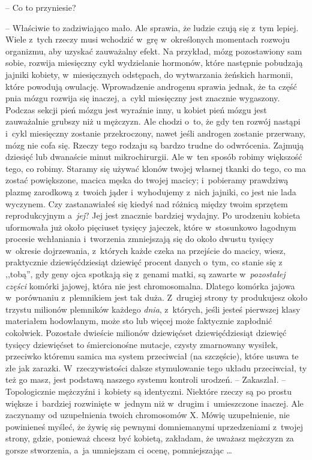 \documentclass[oneside,polish,11pt,rmheadings]{mwbk}
\begin{document}
-- Co to przyniesie?  

-- Właściwie to zadziwiająco mało. Ale sprawia, że ludzie czują się z~tym lepiej. Wiele z~tych rzeczy musi wchodzić w~grę w~określonych momentach rozwoju organizmu, aby uzyskać zauważalny efekt. Na przykład, mózg pozostawiony sam sobie, rozwija miesięczny cykl wydzielanie hormonów, które następnie pobudzają jajniki kobiety, w~miesięcznych odstępach, do wytwarzania żeńskich harmonii, które powodują owulację. Wprowadzenie androgenu sprawia jednak, że ta część pnia mózgu rozwija się inaczej, a~cykl miesięczny jest znacznie wygaszony. Podczas sekcji pień mózgu jest wyraźnie inny, u kobiet pień mózgu jest zauważalnie grubszy niż u mężczyzn. Ale chodzi o~to, że gdy ten rozwój nastąpi i~cykl miesięczny zostanie przekroczony, nawet jeśli androgen zostanie przerwany, mózg nie cofa się. Rzeczy tego rodzaju są bardzo trudne do odwrócenia. Zajmują dziesięć lub dwanaście minut mikrochirurgii. Ale w~ten sposób robimy większość tego, co robimy. Staramy się używać klonów twojej własnej tkanki do tego, co ma zostać powiększone, macica męska do twojej macicy; i~pobieramy prawdziwą plazmę zarodkową z~twoich jąder i~wyhodujemy z~nich jajniki, co jest nie lada wyczynem. Czy zastanawiałeś się kiedyś nad różnicą między twoim sprzętem reprodukcyjnym a~\textit{jej}? Jej jest znacznie bardziej wydajny. Po urodzeniu kobieta uformowała już około pięciuset tysięcy jajeczek, które w~stosunkowo łagodnym procesie wchłaniania i~tworzenia zmniejszają się do około dwustu tysięcy w~okresie dojrzewania, z~których każde czeka na przejście do macicy, wiesz, praktycznie dziewięćdziesiąt dziewięć procent danych o~tym, co stanie się z~ ,,tobą'', gdy geny ojca spotkają się z~genami matki, są zawarte w~\textit{pozostałej części }komórki jajowej, która nie jest chromosomalna. Dlatego komórka jajowa w~porównaniu z~plemnikiem jest tak duża. Z~drugiej strony ty produkujesz około trzystu milionów plemników każdego \textit{dnia}, z~których, jeśli jesteś pierwszej klasy materiałem hodowlanym, może sto lub więcej może faktycznie zapłodnić cokolwiek. Pozostałe dwieście milionów dziewięćset dziewięćdziesiąt dziewięć tysięcy dziewięćset to śmiercionośne mutacje, czysty zmarnowany wysiłek, przeciwko któremu samica ma system przeciwciał (na szczęście), które usuwa te złe jak zarazki. W~rzeczywistości dalsze stymulowanie tego układu przeciwciał, ty też go masz, jest podstawą naszego systemu kontroli urodzeń. -- Zakaszlał. -- Topologicznie mężczyźni i~kobiety są identyczni. Niektóre rzeczy są po prostu większe i~bardziej rozwinięte w~jednym niż w~drugim i~umieszczone inaczej. Ale zaczynamy od uzupełnienia twoich chromosomów X.  Mówię uzupełnienie, nie powinieneś myśleć, że żywię się pewnymi domniemanymi uprzedzeniami z~twojej strony, gdzie, ponieważ chcesz być kobietą, zakładam, że uważasz mężczyzn za gorsze stworzenia, a~ja umniejszam ci ocenę, pomniejszając \ldots  
\end{document}

